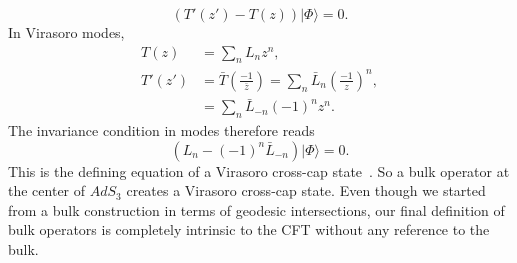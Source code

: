 \documentclass{PoS}
\newcommand{\ket}[1]{|#1\rangle}
\newcommand{\LF}{\left(}
\newcommand{\RF}{\right)}
\begin{document}
\begin{equation}
\LF T'(z') - T(z)\RF \ket{\Phi} = 0.
\label{eq:CCcond}
\end{equation}
In Virasoro modes,
\begin{align}
T(z) &= \sum\limits_n L_n z^n,\nonumber\\
T'(z') &= \bar{T}\LF \frac{-1}{\bar{z}}\RF = \sum\limits_n \bar{L}_n \LF \frac{-1}{z}\RF^n,\nonumber\\
&= \sum\limits_n \bar{L}_{-n}  (-1)^n z^n.
\end{align}
The invariance condition in modes therefore reads
\begin{equation}
\LF L_n - (-1)^n\bar{L}_{-n}\RF \ket{\Phi} = 0 .
\end{equation}
This is the defining equation of a Virasoro cross-cap state~\cite{Blumenhagen:2009zz}. So a bulk operator at the center of $AdS_3$ creates a Virasoro cross-cap state. Even though we started from a bulk construction in terms of geodesic intersections, our final definition of bulk operators is completely intrinsic to the CFT without any reference to the bulk.
\end{document}

